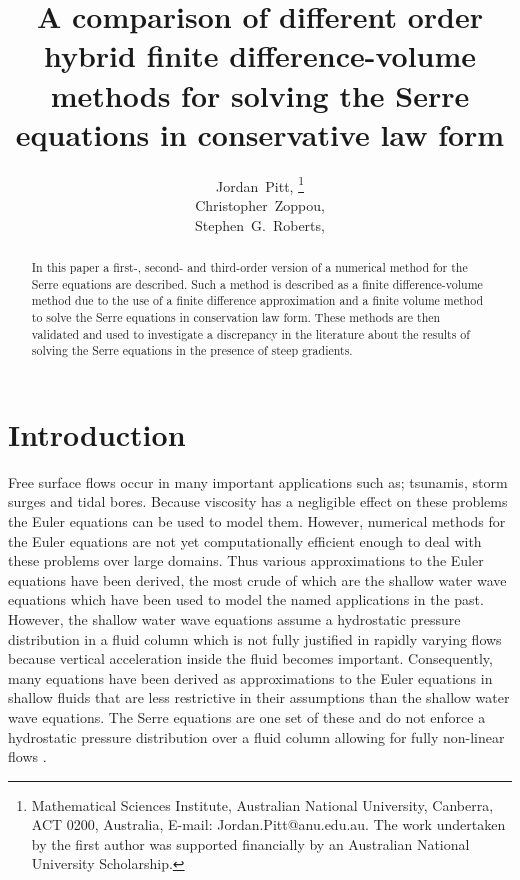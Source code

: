 \documentclass[SingleSpace,12pt,Proceedings]{Serre_ASCE}
\begin{document}
\title{A comparison of different order hybrid finite difference-volume methods for solving the Serre equations in conservative law form}

\author{
Jordan~Pitt,%
\thanks{Mathematical Sciences Institute, Australian National University, Canberra, ACT 0200, Australia, E-mail: Jordan.Pitt@anu.edu.au. The work undertaken by the first author was supported financially by an Australian National University Scholarship.}
\\
Christopher~Zoppou,\footnotemark[1]%
%
\\
Stephen~G.~Roberts,\footnotemark[1]
}

\maketitle

\begin{abstract}
In this paper a first-, second- and third-order version of a numerical method for the Serre equations are described. Such a method is described as a finite difference-volume method due to the use of a finite difference approximation and a finite volume method to solve the Serre equations in conservation law form. These methods are then validated and used to investigate a discrepancy in the literature about the results of solving the Serre equations in the presence of steep gradients. 

\end{abstract}


\linenumbers

\section{Introduction} \label{intro}
Free surface flows occur in many important applications such as; tsunamis, storm surges and tidal bores. Because viscosity has a negligible effect on these problems the Euler equations can be used to model them. However, numerical methods for the Euler equations are not yet computationally efficient enough to deal with these problems over large domains. Thus various approximations to the Euler equations have been derived, the most crude of which are the shallow water wave equations which have been used to model the named applications in the past. However, the shallow water wave equations assume a hydrostatic pressure distribution in a fluid column which is not fully justified in rapidly varying flows because vertical acceleration inside the fluid becomes important. Consequently, many equations have been derived as approximations to the Euler equations in shallow fluids that are less restrictive in their assumptions than the shallow water wave equations. The Serre equations are one set of these and do not enforce a hydrostatic pressure distribution over a fluid column allowing for fully non-linear flows \cite{Bonneton-Lannes-2009-16601}. 
\end{document}
